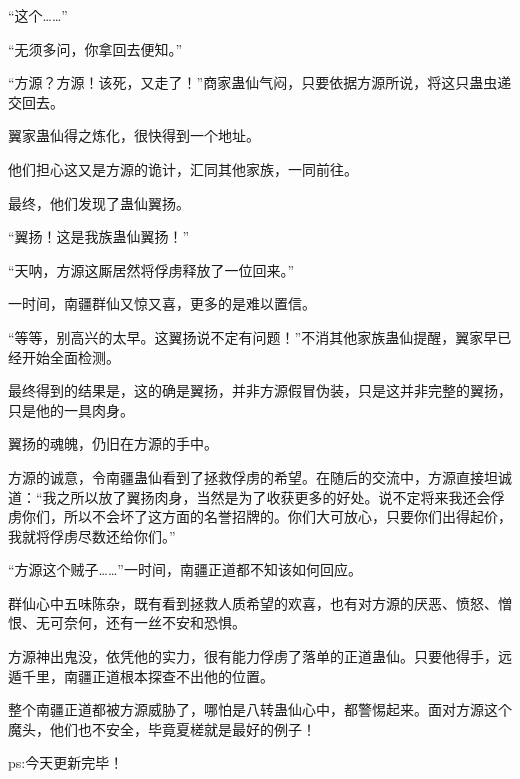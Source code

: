 \begin{this_body}
“这个……”

“无须多问，你拿回去便知。”

“方源？方源！该死，又走了！”商家蛊仙气闷，只要依据方源所说，将这只蛊虫递交回去。

翼家蛊仙得之炼化，很快得到一个地址。

他们担心这又是方源的诡计，汇同其他家族，一同前往。

最终，他们发现了蛊仙翼扬。

“翼扬！这是我族蛊仙翼扬！”

“天呐，方源这厮居然将俘虏释放了一位回来。”

一时间，南疆群仙又惊又喜，更多的是难以置信。

“等等，别高兴的太早。这翼扬说不定有问题！”不消其他家族蛊仙提醒，翼家早已经开始全面检测。

最终得到的结果是，这的确是翼扬，并非方源假冒伪装，只是这并非完整的翼扬，只是他的一具肉身。

翼扬的魂魄，仍旧在方源的手中。

方源的诚意，令南疆蛊仙看到了拯救俘虏的希望。在随后的交流中，方源直接坦诚道：“我之所以放了翼扬肉身，当然是为了收获更多的好处。说不定将来我还会俘虏你们，所以不会坏了这方面的名誉招牌的。你们大可放心，只要你们出得起价，我就将俘虏尽数还给你们。”

“方源这个贼子……”一时间，南疆正道都不知该如何回应。

群仙心中五味陈杂，既有看到拯救人质希望的欢喜，也有对方源的厌恶、愤怒、憎恨、无可奈何，还有一丝不安和恐惧。

方源神出鬼没，依凭他的实力，很有能力俘虏了落单的正道蛊仙。只要他得手，远遁千里，南疆正道根本探查不出他的位置。

整个南疆正道都被方源威胁了，哪怕是八转蛊仙心中，都警惕起来。面对方源这个魔头，他们也不安全，毕竟夏槎就是最好的例子！

ps:今天更新完毕！

\end{this_body}

